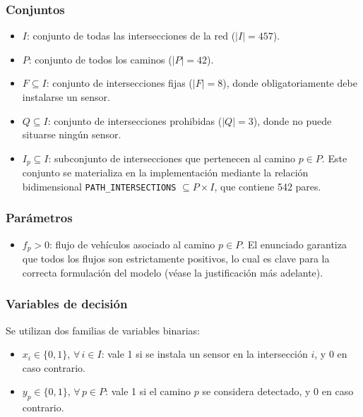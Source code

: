 \documentclass[12pt,a4paper]{article}
\begin{document}
\subsubsection{Conjuntos}

\begin{itemize}
    \item $I$: conjunto de todas las intersecciones de la red ($|I| = 457$).
    \item $P$: conjunto de todos los caminos ($|P| = 42$).
    \item $F \subseteq I$: conjunto de intersecciones fijas ($|F| = 8$), donde obligatoriamente debe instalarse un sensor.
    \item $Q \subseteq I$: conjunto de intersecciones prohibidas ($|Q| = 3$), donde no puede situarse ningún sensor.
    \item $I_p \subseteq I$: subconjunto de intersecciones que pertenecen al camino $p \in P$. Este conjunto se materializa en la implementación mediante la relación bidimensional \texttt{PATH\_INTERSECTIONS} $\subseteq P \times I$, que contiene 542 pares.
\end{itemize}

\subsubsection{Parámetros}

\begin{itemize}
    \item $f_p > 0$: flujo de vehículos asociado al camino $p \in P$. El enunciado garantiza que todos los flujos son estrictamente positivos, lo cual es clave para la correcta formulación del modelo (véase la justificación más adelante).
\end{itemize}

\subsubsection{Variables de decisión}

Se utilizan dos familias de variables binarias:

\begin{itemize}
    \item $x_i \in \{0,1\}$, $\forall\, i \in I$: vale 1 si se instala un sensor en la intersección $i$, y 0 en caso contrario.
    \item $y_p \in \{0,1\}$, $\forall\, p \in P$: vale 1 si el camino $p$ se considera detectado, y 0 en caso contrario.
\end{itemize}
\end{document}
